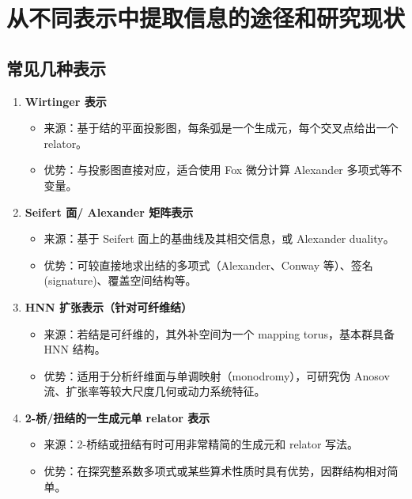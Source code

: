 \documentclass[12pt]{article}
\begin{document}
\section{从不同表示中提取信息的途径和研究现状}

\subsection{常见几种表示}
\begin{enumerate}
    \item \textbf{Wirtinger 表示}
    \begin{itemize}
        \item 来源：基于结的平面投影图，每条弧是一个生成元，每个交叉点给出一个 relator。
        \item 优势：与投影图直接对应，适合使用 Fox 微分计算 Alexander 多项式等不变量。
    \end{itemize}

    \item \textbf{Seifert 面/ Alexander 矩阵表示}
    \begin{itemize}
        \item 来源：基于 Seifert 面上的基曲线及其相交信息，或 Alexander duality。
        \item 优势：可较直接地求出结的多项式（Alexander、Conway 等）、签名 (signature)、覆盖空间结构等。
    \end{itemize}

    \item \textbf{HNN 扩张表示（针对可纤维结）}
    \begin{itemize}
        \item 来源：若结是可纤维的，其外补空间为一个 mapping torus，基本群具备 HNN 结构。
        \item 优势：适用于分析纤维面与单调映射（monodromy），可研究伪 Anosov 流、扩张率等较大尺度几何或动力系统特征。
    \end{itemize}

    \item \textbf{2-桥/扭结的一生成元单 relator 表示}
    \begin{itemize}
        \item 来源：2-桥结或扭结有时可用非常精简的生成元和 relator 写法。
        \item 优势：在探究整系数多项式或某些算术性质时具有优势，因群结构相对简单。
    \end{itemize}
\end{enumerate}
\end{document}
